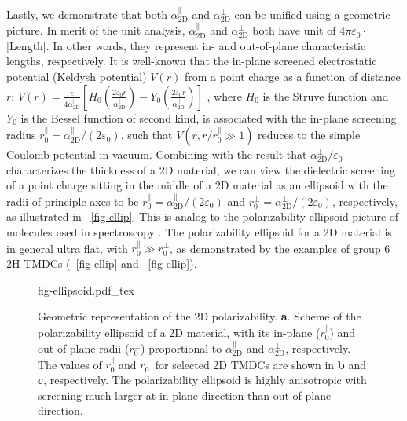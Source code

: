 %
Lastly, we demonstrate that both $\alpha_{\mathrm{2D}}^{\parallel}$
and $\alpha_{\mathrm{2D}}^{\perp}$ can be unified using a geometric
picture. In merit of the unit analysis,
$\alpha_{\mathrm{2D}}^{\parallel}$ and $\alpha_{\mathrm{2D}}^{\perp}$
both have unit of $4\pi\varepsilon_{0} \cdot$[Length]. In other words,
they represent in- and out-of-plane characteristic lengths,
respectively. It is well-known that the in-plane screened
electrostatic potential (Keldysh potential) $V(r)$ from a point charge
as a function of distance $r$:
$V(r) = {\displaystyle \frac{e}{4 \alpha_{\mathrm{2D}}^{\parallel}}}
\left[H_{0}({\displaystyle \frac{2\varepsilon_{0}
      r}{\alpha_{\mathrm{2D}}^{\parallel}}}) - Y_{0}( {\displaystyle
    \frac{2
      \varepsilon_{0}r}{\alpha_{\mathrm{2D}}^{\parallel}}})\right]$
\cite{Keldysh_1979_eps_multi,Pulci_2014_exciton}, where $H_{0}$ is the Struve
function and $Y_{0}$ is the Bessel function of second kind, is
associated with the in-plane screening radius
$r_{0}^{\parallel}=\alpha_{\mathrm{2D}}^{\parallel}/(2
\varepsilon_{0})$, such that $V(r,r/r^{\parallel}_{0} \gg 1)$ reduces
to the simple Coulomb potential in vacuum. Combining with the result
that $\alpha_{\mathrm{2D}}^{\perp}/\varepsilon_{0}$ characterizes the
thickness of a 2D material, we can view the dielectric screening of a
point charge sitting in the middle of a 2D material as an ellipsoid
with the radii of principle axes to be
$r_{0}^{\parallel} = \alpha_{\mathrm{2D}}^{\parallel}/(2
\varepsilon_{0})$ and
$r_{0}^{\perp} = \alpha^{\perp}_{\mathrm{2D}}/(2 \varepsilon_{0})$,
respectively, as illustrated in ~\autoref{fig-ellip}.
This is analog to the polarizability ellipsoid picture of molecules
used in spectroscopy \cite{Banwell_1994_spectro_book}. The polarizability ellipsoid
for a 2D material is in general ultra flat, with
$r_{0}^{\parallel} \gg r_{0}^{\perp}$, as demonstrated by the examples
of group 6 2H TMDCs (~\autoref{fig-ellip} and
~\autoref{fig-ellip}).
%
\begin{figure}[!htbp]
  \centering
  {fig-ellipsoid.pdf_tex}
  \caption{\label{fig-ellip} Geometric representation of the
      2D polarizability. \textbf{a}. Scheme of the polarizability
    ellipsoid of a 2D material, with its in-plane
    ($r_{0}^{\parallel}$) and out-of-plane radii
    ($r_{\mathrm{0}}^{\perp}$) proportional to
    $\alpha_{\mathrm{2D}}^{\parallel}$ and
    $\alpha_{\mathrm{2D}}^{\perp}$, respectively.  The values of
    $r_{0}^{\parallel}$ and $r_{0}^{\perp}$ for selected 2D TMDCs are
    shown in \textbf{b} and \textbf{c}, respectively.  The
    polarizability ellipsoid is highly anisotropic with screening much
    larger at in-plane direction than out-of-plane direction.}
\end{figure}


